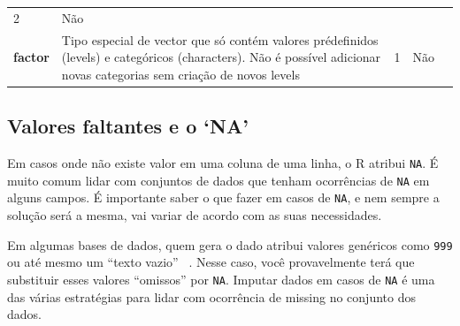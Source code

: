 \documentclass[]{book}
\begin{document}
\begin{longtable}[]{@{}lllll@{}}
\begin{minipage}[t]{0.05\columnwidth}
2\strut
\end{minipage} & \begin{minipage}[t]{0.05\columnwidth}\raggedright\strut
Não\strut
\end{minipage} & \begin{minipage}[t]{0.05\columnwidth}\raggedright\strut
\strut
\end{minipage}\tabularnewline
\begin{minipage}[t]{0.05\columnwidth}\raggedright\strut
\textbf{factor}\strut
\end{minipage} & \begin{minipage}[t]{0.06\columnwidth}\raggedright\strut
Tipo especial de vector que só contém valores prédefinidos (levels) e
categóricos (characters). Não é possível adicionar novas categorias sem
criação de novos levels\strut
\end{minipage} & \begin{minipage}[t]{0.05\columnwidth}\raggedright\strut
1\strut
\end{minipage} & \begin{minipage}[t]{0.05\columnwidth}\raggedright\strut
Não\strut
\end{minipage} & \begin{minipage}[t]{0.05\columnwidth}\raggedright\strut
\strut
\end{minipage}\tabularnewline
\bottomrule
\end{longtable}

\subsection{\texorpdfstring{Valores faltantes e o
`NA'}{Valores faltantes e o NA}}\label{valores-faltantes-e-o-na}

Em casos onde não existe valor em uma coluna de uma linha, o R atribui
\texttt{NA}. É muito comum lidar com conjuntos de dados que tenham
ocorrências de \texttt{NA} em alguns campos. É importante saber o que
fazer em casos de \texttt{NA}, e nem sempre a solução será a mesma, vai
variar de acordo com as suas necessidades.

Em algumas bases de dados, quem gera o dado atribui valores genéricos
como \texttt{999} ou até mesmo um ``texto vazio''
\texttt{\textquotesingle{}\ \textquotesingle{}}. Nesse caso, você
provavelmente terá que substituir esses valores ``omissos'' por
\texttt{NA}. Imputar dados em casos de \texttt{NA} é uma das várias
estratégias para lidar com ocorrência de missing no conjunto dos dados.
\end{document}

